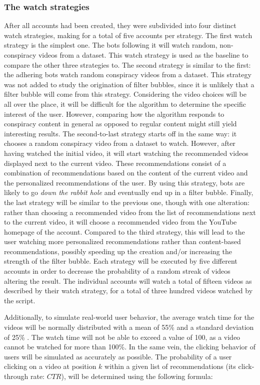 \documentclass[../main.tex]{subfiles}
\begin{document}
\subsubsection{The watch strategies}
After all accounts had been created, they were subdivided into four distinct watch strategies, making for
a total of five accounts per strategy. The first watch strategy is the simplest one. The bots following 
it will watch random, non-conspiracy videos from a dataset. This watch strategy is used as the 
baseline to compare the other three strategies to. The second strategy is similar to the first: the 
adhering bots watch random conspiracy videos from a dataset. This strategy was not added to 
study the origination of filter bubbles, since it is unlikely that a filter bubble will come from this 
strategy. Considering the video choices will be all over the place, it will be difficult for the 
algorithm to determine the specific interest of the user. However, comparing how the algorithm 
responds to conspiracy content in general as opposed to regular content might still yield interesting 
results. The second-to-last strategy starts off in the same way: it chooses a random conspiracy video 
from a dataset to watch. However, after having watched the initial video, it will start watching the 
recommended videos displayed next to the current video. These recommendations consist of a combination of
recommendations based on the content of the current video and the personalized recommendations of the 
user. By using this strategy, bots are likely to go \textit{down the rabbit hole} and eventually end up 
in a filter bubble. Finally, the last strategy will be similar to the previous one, though with one 
alteration: rather than choosing a recommended video from the list of recommendations next to the current
video, it will choose a recommended video from the YouTube homepage of the account. Compared to the third
strategy, this will lead to the user watching more personalized recommendations rather than content-based
recommendations, possibly speeding up the creation and/or increasing the strength of the filter bubble. 
Each strategy will be executed by five different accounts in order to decrease the probability of a 
random streak of videos altering the result. The individual accounts will watch a total of fifteen
videos as described by their watch strategy, for a total of three hundred videos watched by the script. 

Additionally, to simulate real-world user behavior, the average watch time for the videos will be normally
distributed with a mean of 55\% and a standard deviation of 25\% \citep{park2016data}. The watch time will 
not be able to exceed a value of 100, as a video cannot be watched for more than 100\%. In the same vein, the
clicking behavior of users will be simulated as accurately as possible. The probability of a user clicking on
a video at position $k$ within a given list of recommendations (its click-through rate: $CTR$), will be 
determined using the following formula:
\end{document}
